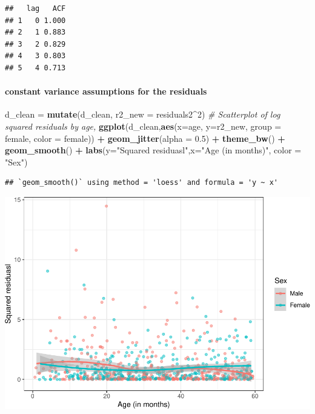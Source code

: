 \documentclass[
]{article}
\newenvironment{Shaded}{\begin{snugshade}}{\end{snugshade}}
\newcommand{\AttributeTok}[1]{\textcolor[rgb]{0.13,0.29,0.53}{#1}}
\newcommand{\CommentTok}[1]{\textcolor[rgb]{0.56,0.35,0.01}{\textit{#1}}}
\newcommand{\DecValTok}[1]{\textcolor[rgb]{0.00,0.00,0.81}{#1}}
\newcommand{\FloatTok}[1]{\textcolor[rgb]{0.00,0.00,0.81}{#1}}
\newcommand{\FunctionTok}[1]{\textcolor[rgb]{0.13,0.29,0.53}{\textbf{#1}}}
\newcommand{\NormalTok}[1]{#1}
\newcommand{\OtherTok}[1]{\textcolor[rgb]{0.56,0.35,0.01}{#1}}
\newcommand{\SpecialCharTok}[1]{\textcolor[rgb]{0.81,0.36,0.00}{\textbf{#1}}}
\newcommand{\StringTok}[1]{\textcolor[rgb]{0.31,0.60,0.02}{#1}}
\begin{document}
\begin{verbatim}
##   lag   ACF
## 1   0 1.000
## 2   1 0.883
## 3   2 0.829
## 4   3 0.803
## 5   4 0.713
\end{verbatim}

\hypertarget{constant-variance-assumptions-for-the-residuals-1}{%
\paragraph{constant variance assumptions for the
residuals}\label{constant-variance-assumptions-for-the-residuals-1}}

\begin{Shaded}
\begin{Highlighting}[]
\NormalTok{d\_clean }\OtherTok{=} \FunctionTok{mutate}\NormalTok{(d\_clean, }\AttributeTok{r2\_new =}\NormalTok{ residuals2}\SpecialCharTok{\^{}}\DecValTok{2}\NormalTok{)}
\CommentTok{\# Scatterplot of log squared residuals by age,}
\FunctionTok{ggplot}\NormalTok{(d\_clean,}\FunctionTok{aes}\NormalTok{(}\AttributeTok{x=}\NormalTok{age, }\AttributeTok{y=}\NormalTok{r2\_new, }\AttributeTok{group =}\NormalTok{ female, }\AttributeTok{color =}\NormalTok{ female)) }\SpecialCharTok{+}
    \FunctionTok{geom\_jitter}\NormalTok{(}\AttributeTok{alpha =} \FloatTok{0.5}\NormalTok{) }\SpecialCharTok{+}
    \FunctionTok{theme\_bw}\NormalTok{() }\SpecialCharTok{+}
    \FunctionTok{geom\_smooth}\NormalTok{() }\SpecialCharTok{+}
    \FunctionTok{labs}\NormalTok{(}\AttributeTok{y=}\StringTok{"Squared residuasl"}\NormalTok{,}\AttributeTok{x=}\StringTok{"Age (in months)"}\NormalTok{, }\AttributeTok{color =} \StringTok{"Sex"}\NormalTok{)}
\end{Highlighting}
\end{Shaded}

\begin{verbatim}
## `geom_smooth()` using method = 'loess' and formula = 'y ~ x'
\end{verbatim}

\includegraphics{ProblemSet3_ts_1677791812_files/figure-latex/unnamed-chunk-16-1.pdf}
\end{document}

